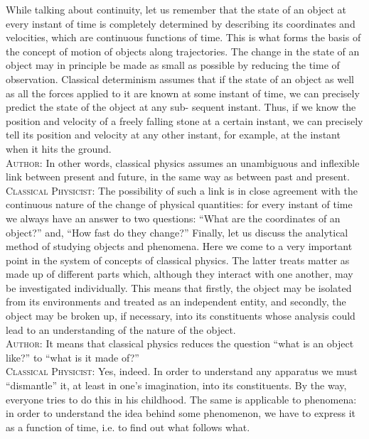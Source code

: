 \documentclass[a4paper,sfsidenotes,colorlinks=true]{tufte-book}
\numberwithin{equation}{section}
\numberwithin{figure}{section}
\begin{document}
While talking about continuity, let us remember that the state of an object at every instant of time is completely determined by describing its coordinates and velocities, which are continuous functions of time. This is what forms the basis of the concept of motion of objects along trajectories. The change in the state of an object may in principle be made as small as possible by reducing the time of observation. Classical determinism assumes that if the state of an object as well as all the forces applied to it are known at some instant of time, we can precisely predict the state of the object at any sub- sequent instant. Thus, if we know the position and velocity of a freely falling stone at a certain instant, we can precisely tell its position and velocity at any other instant, for example, at the instant when it hits the ground.
\\
\textsc{Author:} In other words, classical physics assumes an unambiguous and inflexible link between present and future, in the same way as between past and present.
\\
\textsc{Classical Physicist:} The possibility of such a link is in close agreement with the continuous nature of the change of physical quantities: for every instant of time we always have an answer to two questions: ``What are the coordinates of an object?'' and, ``How fast do they change?'' Finally, let us discuss the analytical method of studying objects and phenomena. Here we come to a very important point in the system of concepts of classical physics. The latter treats matter as made up of different parts which, although they interact with one another, may be investigated individually. This means that firstly, the object may be isolated from its environments and treated as an independent entity, and secondly, the object may be broken up, if necessary, into its constituents whose analysis could lead to an understanding of the nature of the object.
\\
\textsc{Author:} It means that classical physics reduces the question ``what is an object like?'' to ``what is it made of?''
\\
\textsc{Classical Physicist:} Yes, indeed. In order to understand any apparatus we must ``dismantle'' it, at least in one's imagination, into its constituents. By the way, everyone tries to do this in his childhood. The same is applicable to phenomena: in order to understand the idea behind some phenomenon, we have to express it as a function of time, i.e. to find out what follows what.
\\
\end{document}
